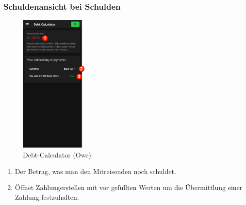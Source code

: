 \subsubsection{Schuldenansicht bei Schulden}\label{debt-calculator_(owe)}
\begin{figure}[H]
    \centering
    \includegraphics[width=0.3\textwidth]{img/pages_numbers/debt-calculator_(owe).drawio}
    \caption[Debt-Calculator (Owe)]{Debt-Calculator (Owe)}
    \label{fig:debt-calculator_(owe)}
\end{figure}
\begin{enumerate}[label=\protect\circled{\arabic*}]
	\item Der Betrag, was man den Mitreisenden noch schuldet.
	\item Öffnet Zahlungerstellen mit vor gefüllten Werten um die Übermittlung einer Zahlung festzuhalten.
\end{enumerate}

